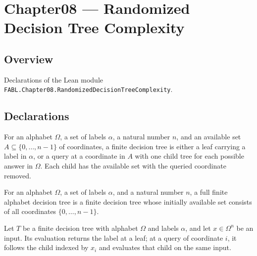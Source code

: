 \chapter{Chapter08 — Randomized Decision Tree Complexity}
\section{Overview}

Declarations of the Lean module \texttt{FABL.Chapter08.RandomizedDecisionTreeComplexity}.

\section{Declarations}

\begin{definition}
\label{FABL.FiniteDecisionTree}
\leanok
For an alphabet $\Omega$, a set of labels $\alpha$, a natural number $n$, and an
available set $A\subseteq\{0,\ldots,n-1\}$ of coordinates, a finite decision tree is
either a leaf carrying a label in $\alpha$, or a query at a coordinate in $A$ with one
child tree for each possible answer in $\Omega$. Each child has the available set with
the queried coordinate removed.
\end{definition}

\begin{definition}
\label{FABL.FiniteAlphabetDecisionTree}
\leanok
{}
For an alphabet $\Omega$, a set of labels $\alpha$, and a natural number $n$, a full
finite alphabet decision tree is a finite decision tree whose initially available set
consists of all coordinates $\{0,\ldots,n-1\}$.
\end{definition}

\begin{definition}
\label{FABL.FiniteDecisionTree.eval}
\leanok
{}
Let $T$ be a finite decision tree with alphabet $\Omega$ and labels $\alpha$, and let
$x\in\Omega^n$ be an input. Its evaluation returns the label at a leaf; at a query of
coordinate $i$, it follows the child indexed by $x_i$ and evaluates that child on the
same input.
\end{definition}

